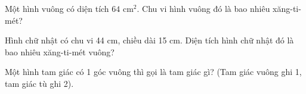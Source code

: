 \begin{ex}
Một hình vuông có diện tích $64\text{ cm}^2$. Chu vi hình vuông đó là bao nhiêu xăng-ti-mét?
\end{ex}

\begin{ex}
Hình chữ nhật có chu vi 44 cm, chiều dài 15 cm. Diện tích hình chữ nhật đó là bao nhiêu xăng-ti-mét vuông?
\end{ex}

\begin{ex}
Một hình tam giác có 1 góc vuông thì gọi là tam giác gì? (Tam giác vuông ghi 1, tam giác tù ghi 2).
\end{ex}
